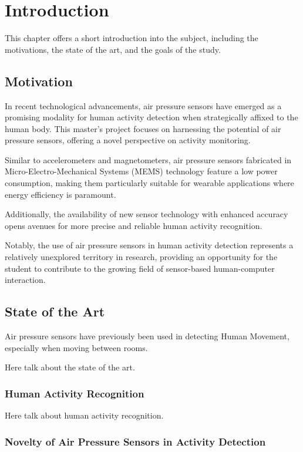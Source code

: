 \chapter{Introduction}

This chapter offers a short introduction into the subject, including the motivations, the state of the art, and the goals of the study.

\section{Motivation}
In recent technological advancements, air pressure sensors have emerged as a promising modality for human activity detection when strategically affixed to the human body. This master’s project focuses on harnessing the potential of air pressure sensors, offering a novel perspective on activity monitoring. 

Similar to accelerometers and magnetometers, air pressure sensors fabricated in Micro-Electro-Mechanical Systems (MEMS) technology feature a low power consumption, making them particularly suitable for wearable applications where energy efficiency is paramount. 

Additionally, the availability of new sensor technology with enhanced accuracy opens avenues for more precise and reliable human activity recognition. 

Notably, the use of air pressure sensors in human activity detection represents a relatively unexplored territory in research, providing an opportunity for the student to contribute to the growing field of sensor-based human-computer interaction.

\section{State of the Art}
Air pressure sensors have previously been used in detecting Human Movement, especially when moving between rooms.\cite{patel2008detecting}

Here talk about the state of the art.

\subsection{Human Activity Recognition}
Here talk about human activity recognition. 

\subsection{Novelty of Air Pressure Sensors in Activity Detection}


